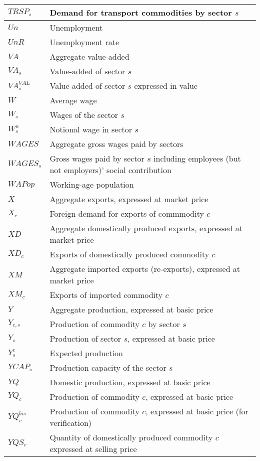 \documentclass[12pt]{article}
\numberwithin{equation}{section}
\begin{document}
\begin{longtable}{@{}p{4cm}p{9cm}@{}}
 \midrule 
$TRSP_{s}$ & Demand for transport commodities by sector $s$ \\
 \midrule 
$Un$ & Unemployment \\
 \midrule 
$UnR$ & Unemployment rate \\
 \midrule 
$VA$ & Aggregate value-added \\
 \midrule 
$VA_{s}$ & Value-added of sector $s$ \\
 \midrule 
$VA^{VAL}_{s}$ & Value-added of sector $s$ expressed in value \\
 \midrule 
$W$ & Average wage \\
 \midrule 
$W_{s}$ & Wages of the sector $s$ \\
 \midrule 
$W^{n}_{s}$ & Notional wage in sector $s$ \\
 \midrule 
$WAGES$ & Aggregate gross wages paid by sectors \\
 \midrule 
$WAGES_{s}$ & Gross wages paid by sector $s$ including employees (but not employers)' social contribution \\
 \midrule 
$WAPop$ & Working-age population \\
 \midrule 
$X$ & Aggregate exports, expressed at market price \\
 \midrule 
$X_{c}$ & Foreign demand for exports of commmodity $c$ \\
 \midrule 
$XD$ & Aggregate domestically produced exports, expressed at market price \\
 \midrule 
$XD_{c}$ & Exports of domestically produced commodity $c$ \\
 \midrule 
$XM$ & Aggregate imported exports (re-exports), expressed at market price \\
 \midrule 
$XM_{c}$ & Exports of imported commodity $c$ \\
 \midrule 
$Y$ & Aggregate production, expressed at basic price \\
 \midrule 
$Y_{c, s}$ & Production of commodity $c$ by sector $s$ \\
 \midrule 
$Y_{s}$ & Production of sector $s$, expressed at basic price \\
 \midrule 
$Y^{e}_{s}$ & Expected production \\
 \midrule 
$YCAP_{s}$ & Production capacity of the sector $s$ \\
 \midrule 
$YQ$ & Domestic production, expressed at basic price \\
 \midrule 
$YQ_{c}$ & Production of commodity $c$, expressed at basic price \\
 \midrule 
$YQ^{bis}_{c}$ & Production of commodity $c$, expressed at basic price (for verification) \\
 \midrule 
$YQS_{c}$ & Quantity of domestically produced commodity $c$ expressed at selling price \\
\end{longtable}
\end{document}
